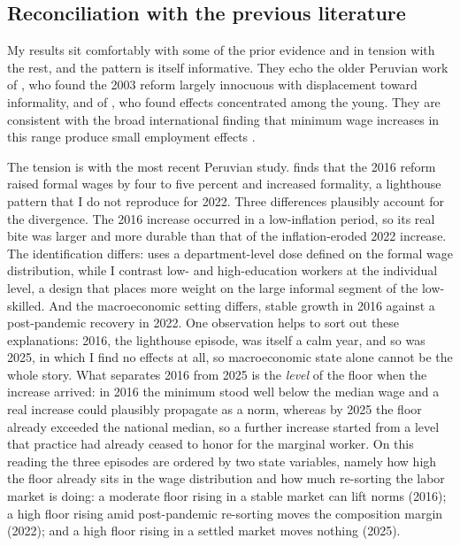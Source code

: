 \subsection{Reconciliation with the previous literature}\label{sec:reconciliation}

My results sit comfortably with some of the prior evidence and in tension with the rest, and the pattern is itself informative. They echo the older Peruvian work of \citet{jaramillo_lopez_2006}, who found the 2003 reform largely innocuous with displacement toward informality, and of \citet{cespedes_2005}, who found effects concentrated among the young. They are consistent with the broad international finding that minimum wage increases in this range produce small employment effects \citep{card_krueger_1995, cengiz_2019}.

The tension is with the most recent Peruvian study. \citet{jimenez_2023} finds that the 2016 reform raised formal wages by four to five percent and increased formality, a lighthouse pattern that I do not reproduce for 2022. Three differences plausibly account for the divergence. The 2016 increase occurred in a low-inflation period, so its real bite was larger and more durable than that of the inflation-eroded 2022 increase. The identification differs: \citet{jimenez_2023} uses a department-level dose defined on the formal wage distribution, while I contrast low- and high-education workers at the individual level, a design that places more weight on the large informal segment of the low-skilled. And the macroeconomic setting differs, stable growth in 2016 against a post-pandemic recovery in 2022. One observation helps to sort out these explanations: 2016, the lighthouse episode, was itself a calm year, and so was 2025, in which I find no effects at all, so macroeconomic state alone cannot be the whole story. What separates 2016 from 2025 is the \emph{level} of the floor when the increase arrived: in 2016 the minimum stood well below the median wage and a real increase could plausibly propagate as a norm, whereas by 2025 the floor already exceeded the national median, so a further increase started from a level that practice had already ceased to honor for the marginal worker. On this reading the three episodes are ordered by two state variables, namely how high the floor already sits in the wage distribution and how much re-sorting the labor market is doing: a moderate floor rising in a stable market can lift norms (2016); a high floor rising amid post-pandemic re-sorting moves the composition margin (2022); and a high floor rising in a settled market moves nothing (2025).

